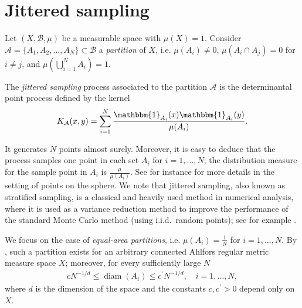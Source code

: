 \documentclass[a4paper,11pt]{amsart}
\begin{document}
\section{Jittered sampling}

Let $(X,\mathcal{B},\mu)$ be a measurable space with $\mu(X)=1$. Consider $\mathcal{A}=\{A_1,A_2,\dots,A_N\}\subset \mathcal{B}$ a \textit{partition} of $X$, i.e. $\mu(A_i)\neq 0$, $\mu(A_i\cap A_j)=0$ for  $i\neq j$, and $\mu\left(\bigcup\limits_{i=1}^N A_i\right)=1$.

The \textit{jittered sampling} process associated to the partition $\mathcal{A}$ is the determinantal point process defined by the kernel
$$K_\mathcal{A}(x,y)=\sum\limits_{i=1}^N \frac{\mathbbm{1}_{A_i}(x)\mathbbm{1}_{A_i}(y)}{\mu(A_i)}.$$

It generates $N$ points almost surely. Moreover, it is easy to deduce that the process samples one point in each set $A_i$ for $i=1,\dots,N$; the distribution measure for the sample point in  $A_i$ is $\frac{\mu}{\mu(A_i)}$. See for instance \cite{Brauchart2020} for more details in the setting of points on the sphere. We note that jittered sampling, also known as stratified sampling, is a classical and heavily used method in numerical analysis, where it is used as a variance reduction method to improve the performance of the standard Monte Carlo method (using i.i.d.\ random points); see for example \cite{Glasserman2003,lemieux2009monte}.

We focus on the case of \textit{equal-area partitions}, i.e. $\mu(A_i)=\frac{1}{N}$ for $i=1,\dots, N$. By \cite[Theorem 2]{Gigante2016}, such a partition exists for an arbitrary connected Ahlfors regular metric measure space $X$; moreover, for every sufficiently large $N$
\begin{align}\label{diam_bounds}
    cN^{-1/d}\leq \operatorname{diam}(A_i)\leq c^\prime N^{-1/d},\quad i=1,\dots,N,
\end{align} where $d$ is the dimension of the space and the constants $c,c^\prime>0$  depend only on $X$.
\end{document}
